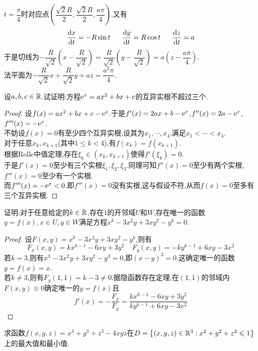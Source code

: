 \documentclass{ctexart}
\begin{document}
\begin{solution}
    $t=\dfrac{\pi}{4}$时对应点$\left(\dfrac{\sqrt2R}{2},\dfrac{\sqrt2R}{2},\dfrac{a\pi}{4}\right)$.又有
    \[\dfrac{\di x}{\di t}=-R\sin t\ \ \ \ \ \dfrac{\di y}{\di t}=R\cos t\ \ \ \ \ \dfrac{\di z}{\di t}=a\]
    于是切线为$-\dfrac{R}{\sqrt2}\left(x-\dfrac{R}{\sqrt2}\right)=\dfrac{R}{\sqrt2}\left(y-\dfrac{R}{\sqrt2}\right)=a\left(z-\dfrac{a\pi}{4}\right)$.\\
    法平面为$-\dfrac{R}{\sqrt2}x+\dfrac{R}{\sqrt2}y+az=\dfrac{a^2\pi}{4}$.
\end{solution}
\begin{problem}[6.(10\songti{分})]
    设$a,b,c\in\mathbb{R}$.试证明:方程$\mathrm{e}^x=ax^2+bx+c$的互异实根不超过三个.
\end{problem}
\begin{proof}
    设$f(x)=ax^2+bx+c-\mathrm{e}^x$.于是$f'(x)=2ax+b-\mathrm{e}^x$,$f''(x)=2a-\mathrm{e}^x$,$f'''(x)=-\mathrm{e}^x$.\\
    不妨设$f(x)=0$有至少四个互异实根,设其为$x_1,\cdots,x_4$,满足$x_1<\cdots<x_4$.\\
    对于任意$x_k,x_{k+1}$(其中$1\leqslant k<4$),有$f(x_k)=f(x_{k+1})$.\\
    根据Rolle中值定理,存在$\xi_k\in(x_k,x_{k+1})$使得$f'(\xi_k)=0$.\\
    于是$f'(x)=0$至少有三个实根$\xi_1,\xi_2,\xi_3$.同理可知$f''(x)=0$至少有两个实根,$f'''(x)=0$至少有一个实根.\\
    而$f'''(x)=-\mathrm{e}^x<0$,即$f'''(x)=0$没有实根,这与假设不符,从而$f(x)=0$至多有三个互异实根.
\end{proof}
\begin{problem}[7.(10\songti{分})]
    证明:对于任意给定的$k\in\mathbb{R}$,存在$1$的开邻域$U$和$W$,存在唯一的函数$y=f(x),x\in U,y\in W$满足方程$x^k-3x^2y+3xy^2-y^k=0$.
\end{problem}
\begin{proof}
    设$F(x,y)=x^k-3x^2y+3xy^2-y^k$,则有
    \[F_x(x,y)=kx^{k-1}-6xy+3y^2\ \ \ \ \ F_y(x,y)=-ky^{k-1}+6xy-3x^2\]
    若$k=3$,则有$x^3-3x^2y+3xy^2-y^3=0$,即$(x-y)^3=0$.这确定唯一的函数$y=f(x)=x$.\\
    若$k\neq3$,则有$F_y(1,1)=k-3\neq0$.据隐函数存在定理,在$(1,1)$的邻域内$F(x,y)\equiv0$确定唯一的$y=f(x)$且
    \[f'(x)=-\dfrac{F_x}{F_y}=\dfrac{kx^{k-1}-6xy+3y^2}{ky^{k-1}+6xy-3x^2}\]
\end{proof}
\begin{problem}[8.(15\songti{分})]
    求函数$f(x,y,z)=x^3+y^3+z^3-4xyz$在$D=\left\{(x,y,z)\in\mathbb{R}^3:x^2+y^2+z^2\leqslant1\right\}$上的最大值和最小值.
\end{problem}
\end{document}
